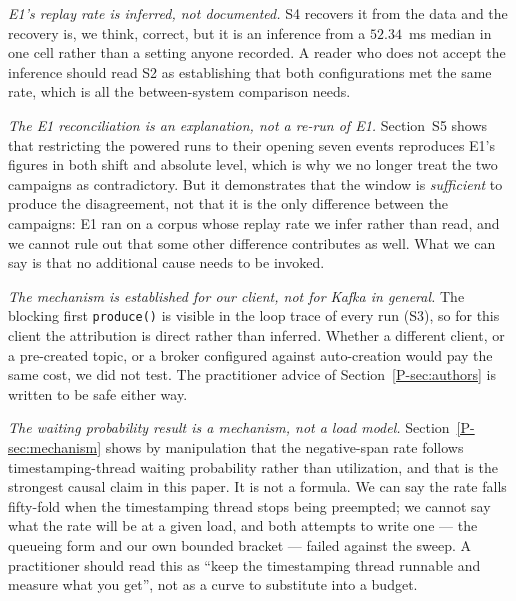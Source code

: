 \documentclass[10pt,journal,onecolumn]{IEEEtran}
\newcommand{\kafka}{Kafka}
\newcommand{\mainModeA}{\ref{P-sec:mechanism}}             %
\newcommand{\mainAuthors}{\ref{P-sec:authors}}        %
\begin{document}
\emph{E1's replay rate is inferred, not documented.} S4 recovers it
from the data and the recovery is, we think, correct, but it is an inference from a
$52.34$~ms median in one cell rather than a setting anyone recorded. A reader who does not accept
the inference should read S2 as establishing that both configurations met the same rate,
which is all the between-system comparison needs.

\emph{The E1 reconciliation is an explanation, not a re-run of E1.} Section~S5 shows
that restricting the powered runs to their opening seven events reproduces E1's figures in both
shift and absolute level, which is why we no longer treat the two campaigns as contradictory. But
it demonstrates that the window is \emph{sufficient} to produce the disagreement, not that it is
the only difference between the campaigns: E1 ran on a corpus whose replay rate we infer rather
than read, and we cannot rule out that some other difference contributes as well. What we can say
is that no additional cause needs to be invoked.

\emph{The mechanism is established for our client, not for \kafka{} in general.} The blocking
first \texttt{produce()} is visible in the loop trace of every run (S3), so for this client the attribution is direct rather than
inferred. Whether a different client, or a pre-created topic, or a broker configured against
auto-creation would pay the same cost, we did not test. The practitioner advice of Section~\mainAuthors{} is written to be safe either way.

\emph{The waiting probability result is a mechanism, not a load model.} Section~\mainModeA{} shows by manipulation that the negative-span rate follows timestamping-thread waiting probability rather than utilization,
and that is the strongest causal claim in this paper. It is not a formula. We can say the rate
falls fifty-fold when the timestamping thread stops being preempted; we cannot say what the rate will
be at a given load, and both attempts to write one --- the queueing form and our own bounded bracket ---
failed against the sweep. A practitioner should read this as ``keep the timestamping thread runnable
and measure what you get'', not as a curve to substitute into a budget.
\end{document}
